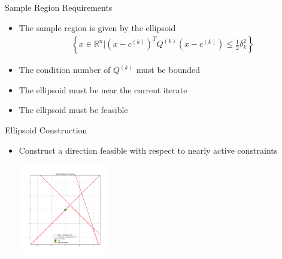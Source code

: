 \documentclass{beamer}
\newcommand{\Rn}{\mathbb R ^ {n}}
\begin{document}
\begin{frame}{Sample Region Requirements}
	\begin{itemize}
		\setlength\itemsep{1.5em}
		\item The sample region is given by the ellipsoid
\begin{align*}
\left\{x \in \Rn \bigg | \left(x - c^{(k)}\right)^TQ^{(k)}\left(x - c^{(k)}\right) \le \frac 1 2 \delta_k^2 \right\}
\end{align*}
		\item The condition number of $Q^{(k)}$ must be bounded
		\item The ellipsoid must be near the current iterate
		\item The ellipsoid must be feasible
	\end{itemize}
\end{frame}




\begin{frame}{Ellipsoid Construction}
	\begin{itemize}
		\item Construct a direction feasible with respect to nearly active constraints
		\begin{center}
			\includegraphics[width=150px]{images/active_constraints.png}
		\end{center}
	\end{itemize}
\end{frame}
\end{document}
